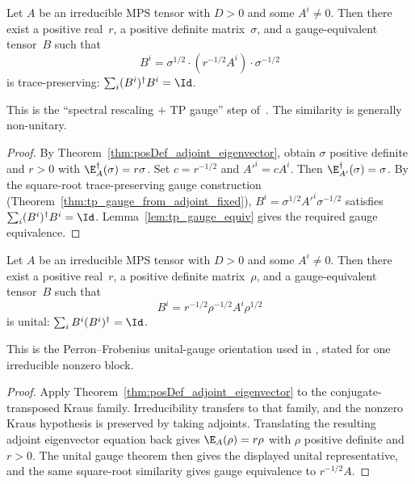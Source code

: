 \begin{theorem}%
    \label{thm:tp_data_irreducible}
    \leanok
    Let $A$ be an irreducible MPS tensor with $D > 0$
    and some $A^i \neq 0$.
    Then there exist a positive real~$r$, a positive definite
    matrix~$\sigma$, and a gauge-equivalent tensor~$B$ such that
    \[
        B^i = \sigma^{1/2} \cdot (r^{-1/2} A^i) \cdot \sigma^{-1/2}
    \]
    is trace-preserving:
    $\sum_i (B^i)^\dagger B^i = \Id$.

    This is the ``spectral rescaling $+$ TP gauge'' step of~\cite[Appendix~A]{Cirac2016MPDO_arXiv}.
    The similarity is generally non-unitary.
\end{theorem}

\begin{proof}\leanok
    By Theorem~\ref{thm:posDef_adjoint_eigenvector},
    obtain $\sigma$ positive definite and $r > 0$ with
    $\E_A^\dagger(\sigma) = r \sigma$.
    Set $c = r^{-1/2}$ and $A'^i = c A^i$.
    Then $\E_{A'}^\dagger(\sigma) = \sigma$.
    By the square-root trace-preserving gauge construction
    (Theorem~\ref{thm:tp_gauge_from_adjoint_fixed}),
    $B^i = \sigma^{1/2} A'^i \sigma^{-1/2}$
    satisfies $\sum_i (B^i)^\dagger B^i = \Id$.
    Lemma~\ref{lem:tp_gauge_equiv} gives the required gauge equivalence.
\end{proof}

\begin{theorem}%
    \label{thm:unital_data_irreducible}
    \leanok
    Let $A$ be an irreducible MPS tensor with $D > 0$
    and some $A^i \neq 0$.
    Then there exist a positive real~$r$, a positive definite
    matrix~$\rho$, and a gauge-equivalent tensor~$B$ such that
    \[
        B^i = r^{-1/2}\rho^{-1/2}A^i\rho^{1/2}
    \]
    is unital:
    $\sum_i B^i(B^i)^\dagger = \Id$.

    This is the Perron--Frobenius unital-gauge orientation used in
    \cite[Theorem~4, lines~765--770]{PerezGarcia2007Matrix},
    stated for one irreducible nonzero block.
\end{theorem}

\begin{proof}\leanok
    Apply Theorem~\ref{thm:posDef_adjoint_eigenvector} to the
    conjugate-transposed Kraus family. Irreducibility transfers to that
    family, and the nonzero Kraus hypothesis is preserved by taking adjoints.
    Translating the resulting adjoint eigenvector equation back gives
    $\E_A(\rho)=r\rho$ with $\rho$ positive definite and $r>0$. The unital
    gauge theorem then gives the displayed unital representative, and the
    same square-root similarity gives gauge equivalence to $r^{-1/2}A$.
\end{proof}

